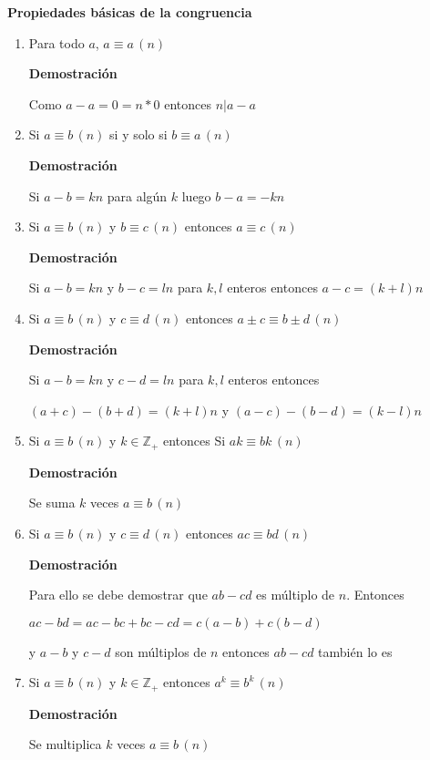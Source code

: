 \documentclass[a4paper,12pt]{report}
\begin{document}
\textbf{Propiedades básicas de la congruencia}
\begin{enumerate}
 \item Para todo $a$, $a \equiv a \, (n)$
 
 \textbf{Demostración}
 
 Como $a-a = 0 = n*0$ entonces $n|a-a$
 
 \item Si $a \equiv b \, (n)$ si y solo si $b \equiv a \, (n)$
 
 \textbf{Demostración}
 
 Si $a-b=kn$ para algún $k$ luego $b-a=-kn$
 
 \item Si $a \equiv b \, (n)$ y $b \equiv c \, (n)$ entonces $a \equiv c \, (n)$
 
 \textbf{Demostración}
 
 Si $a-b=kn$ y $b-c=ln$ para $k,l$ enteros entonces $a-c=(k+l)n$
 
 \item Si $a \equiv b \, (n)$ y $c \equiv d \, (n)$ entonces $a\pm c \equiv b\pm d \, (n)$
 
 \textbf{Demostración}
 
 Si $a-b=kn$ y $c-d=ln$ para $k,l$ enteros entonces 
 
 $(a+c)-(b+d)=(k+l)n$ y $(a-c)-(b-d)=(k-l)n$
 
 \item Si $a \equiv b \, (n)$ y $k\in\mathbb{Z}_+$ entonces Si $ak \equiv bk \, (n)$
 
 \textbf{Demostración}
 
 Se suma $k$ veces $a \equiv b \, (n)$
 
 \item Si $a \equiv b \, (n)$ y $c \equiv d \, (n)$ entonces $ac \equiv bd \, (n)$
 
 \textbf{Demostración}
 
 Para ello se debe demostrar que $ab - cd$ es múltiplo de $n$. Entonces 
 
 $ac - bd = ac - bc + bc - cd = c(a-b) + c(b-d)$
 
 y $a-b$ y $c-d$ son múltiplos de $n$ entonces $ab - cd$ también lo es
 
 
 \item Si $a \equiv b \, (n)$ y $k\in\mathbb{Z}_+$ entonces $a^k \equiv b^k \, (n)$
 
  \textbf{Demostración}
 
 Se multiplica $k$ veces $a \equiv b \, (n)$
 

\end{enumerate}
\end{document}
